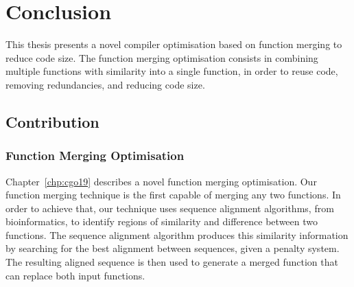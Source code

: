
\chapter{Conclusion} \label{chp:conclusion}


This thesis presents a novel compiler optimisation based on function merging to reduce code size.
The function merging optimisation consists in combining multiple functions with similarity into a single function, in order to reuse code, removing redundancies, and reducing code size.




\section{Contribution} \label{sec:conclusion:contribution}

\subsection{Function Merging Optimisation}

Chapter~\ref{chp:cgo19} describes a novel function merging optimisation.
Our function merging technique is the first capable of merging any two functions.
In order to achieve that, our technique uses sequence alignment algorithms, from bioinformatics, to identify regions of similarity and difference between two functions.
The sequence alignment algorithm produces this similarity information by searching for the best alignment between sequences, given a penalty system. 
The resulting aligned sequence is then used to generate a merged function that can replace both input functions.


